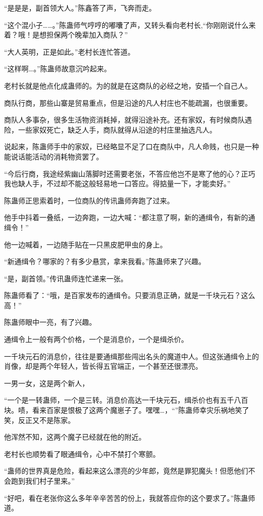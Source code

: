 \begin{this_body}
“是是是，副首领大人。”陈鑫答了声，飞奔而走。

“这个混小子……。”陈蛊师气哼哼的嘟囔了声，又转头看向老村长,“你刚刚说什么来着？哦！是想担保两个晚辈加入商队？”

“大人英明，正是如此。”老村长连忙答道。

“这样啊…。”陈蛊师故意沉吟起来。

老村长就是他点化成蛊师的。为的就是在这商队的必经之地，安插一个自己人。

商队行商，那些山寨是贸易重点，但是沿途的凡人村庄也不能疏漏，也很重要。

商队人多事杂，很多生活物资消耗掉，就得沿途补充。还有家奴，有时候商队遇险，一些家奴死亡，缺乏人手，商队就得从沿途的村庄里抽选凡人。

说起来，陈蛊师手中的家奴，已经略显不足了口在商队中，凡人命贱，也只是一种能说话能活动的消耗物资罢了。

“今后行商，我途经紫幽山落脚时还需要老张，不答应他岂不是寒了他的心？正巧我也缺人手，不过却不能这般轻易地一口答应。得掂量一下，才能卖好。”

陈蛊师正思索着时，一位商队的传讯蛊师奔跑了过来。

他手中抖着一叠纸，一边奔跑，一边大喊：“都注意了啊，新的通缉令，有新的通缉令！”

他一边喊着，一边随手贴在一只黑皮肥甲虫的身上。

“新通缉令？哪家的？有多少悬赏，拿来我看。”陈蛊师来了兴趣。

“是，副首领。”传讯蛊师连忙递来一张。

陈蛊师看了：“哦，是百家发布的通缉令。只要消息正确，就是一千块元石？这么高！”

陈蛊师眼中一亮，有了兴趣。

通缉令上一般有两个价格，一个是消息价，一个是缉杀价。

一千块元石的消息价，往往是要通缉那些闯出名头的魔道中人。但这张通缉令上的肖像，却是两个年轻人，皆长得五官端正，一个甚至还很漂亮。

一男一女，这是两个新人，

“一个是一转蛊师，一个是三转。消息价高达一千块元石，缉杀价也有五千八百块。啧，看来百家是恨极了这两个魔崽子了。嘿嘿…，“”陈蛊师幸灾乐祸地笑了笑，反正又不是陈家。

他浑然不知，这两个魔子已经就在他的附近。

老村长也顺势看了眼通缉令，心中不禁打个寒颤。

“蛊师的世界真是危险，看起来这么漂亮的少年郎，竟然是罪犯魔头！但愿他们不会跑到我们村子里来。”

“好吧，看在老张你这么多年辛辛苦苦的份上，我就答应你的这个要求了。”陈蛊师道。


\end{this_body}
